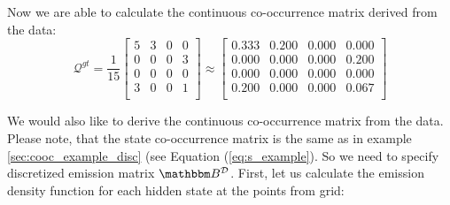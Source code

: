 \documentclass[shortabstract]{iithesis}
\begin{document}
Now we are able to calculate the continuous co-occurrence matrix derived from the data:
\begin{equation*}
    \mathcal Q^{gt} = \frac 1 {15}  
    \left[\begin{array}{rrrr}
         5 &  3 &  0 &  0 \\
         0 &  0 &  0 &  3 \\
         0 &  0 &  0 &  0 \\
         3 &  0 &  0 &  1 \\
\end{array} \right] 
\approx 
\left[\begin{array}{rrrr}
        0.333 & 0.200 & 0.000 & 0.000 \\
        0.000 & 0.000 & 0.000 & 0.200 \\
        0.000 & 0.000 & 0.000 & 0.000 \\
        0.200 & 0.000 & 0.000 & 0.067 \\
\end{array} \right] 
\end{equation*}


We would also like to derive the continuous co-occurrence matrix from the data. Please note, that the state co-occurrence matrix is the same as in example \ref{sec:cooc_example_disc} (see Equation (\ref{eq:s_example}). 
So we need to specify discretized emission matrix $\mathbbm B^{\mathcal D}$. First, let us calculate the emission density function for each hidden state at the points from grid:
\end{document}
